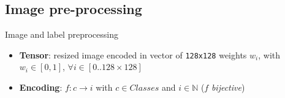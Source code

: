 \subsection{Image pre-processing}
\begin{frame}[c]{Image and label preprocessing}
    \Large
    \begin{itemize}
    \tightlist
    \item \textbf{Tensor}: resized image encoded in vector of \texttt{128x128} weights $w_i$, with $w_i \in [0, 1]$, $\forall i \in [0..128\times128]$
    \item \textbf{Encoding}: $f: c \to i$ with $c \in Classes$ and $i \in \mathbb{N}$ ($f$ \emph{bijective})
    \end{itemize}
\end{frame}

